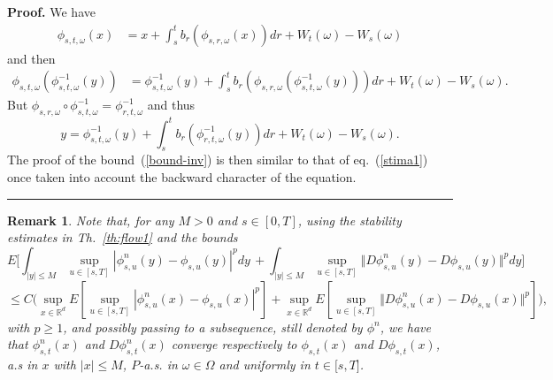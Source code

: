 \documentclass[a4paper,10pt]{article}
\newtheorem{remark}[theorem]{Remark}
\newenvironment{proof}[1][Proof]{\textbf{#1.} }{\ \rule{0.5em}{0.5em}}
\begin{document}
\begin{proof} We have%
\begin{align*}
\phi_{s,t,\omega}\left(  x\right)   &  =x+\int_{s}^{t}b_{r}\left(
\phi_{s,r,\omega}\left(  x\right)  \right)  dr+W_{t}\left(
\omega\right)
-W_{s}\left(  \omega\right) \end{align*}
and then
\begin{align*}
\phi_{s,t,\omega}\left(  \phi_{s,t,\omega}^{-1}\left(  y\right)
\right)   & =\phi_{s,t,\omega}^{-1}\left(  y\right)
+\int_{s}^{t}b_{r}\left( \phi_{s,r,\omega}\left(
\phi_{s,t,\omega}^{-1}\left(  y\right)  \right) \right)
dr+W_{t}\left(  \omega\right)  -W_{s}\left(  \omega\right)  .
\end{align*}
But
$
\phi_{s,r,\omega}\circ\phi_{s,t,\omega}^{-1}=\phi_{r,t,\omega}^{-1}%
$
and thus
\[
y=\phi_{s,t,\omega}^{-1}\left(  y\right)  +\int_{s}^{t}b_{r}\left(
\phi_{r,t,\omega}^{-1}\left(  y\right)  \right)  dr+W_{t}\left(
\omega\right)  -W_{s}\left(  \omega\right)  .
\]
The proof of the bound~(\ref{bound-inv})  is then similar to that
of eq.~(\ref{stima1}) once taken into account the backward
character of the equation.
\end{proof}







\begin{remark}
\label{civuole}  Note that, for any $M > 0$ and $s \in[0,T]$, using the
stability estimates in Th.~\ref{th:flow1}
and the bounds
\[
E \Big [  \int_{|y|\leq M} \sup_{u\in[s,T]}
 |\phi_{s,u}^{n}(y)-\phi_{s,u}(y)|^{p}dy \, +
\int_{|y|\leq M} \sup_{u\in[s,T]} \Vert D\phi_{s,u} ^{n}(y)- D
\phi_{s,u} (y)\Vert^{p}dy \Big]
\]
$$ \leq C \Big(
\sup_{x\in{\mathbb{R}}^{d}}E[ \sup_{u\in[s,T]}  |\phi_{s,u}^{n}%
(x)-\phi_{s,u}(x)|^{p}] +  \sup_{x\in{\mathbb{R}}^{d}}
 E[\sup_{u \in [s,T]}\Vert D\phi_{s,u}
^{n}(x)- D \phi_{s,u} (x)\Vert^{p}] \Big),
$$
 with $p \ge 1$, and possibly passing
 to a subsequence, still denoted by $\phi^{n}$, we have that
$\phi_{s,t}^{n}(x)$ and $D\phi_{s,t}^{n}(x)$ converge
 respectively
  to $\phi_{s,t}(x)$ and $D\phi_{s,t}(x)$, a.s in $x$ with
$|x|\leq M$,  $P$-a.s. in $\omega\in\Omega$ and uniformly  in
$t\in\lbrack s,T]$.
\end{remark}
\end{document}
